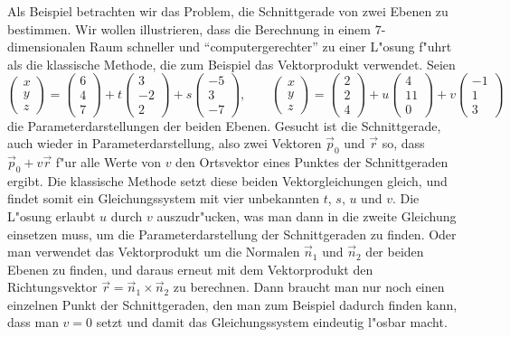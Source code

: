 Als Beispiel betrachten wir das Problem, die Schnittgerade von
zwei Ebenen zu bestimmen.
Wir wollen illustrieren, dass die
Berechnung in einem 7-dimensionalen Raum schneller und
``computergerechter'' zu einer L"osung f"uhrt als die klassische
Methode, die zum Beispiel das Vektorprodukt verwendet.
Seien 
\begin{equation}
\begin{pmatrix}x\\y\\z\end{pmatrix}
=
\begin{pmatrix}6\\4\\7\end{pmatrix}
+t
\begin{pmatrix}3\\-2\\2\end{pmatrix}
+s
\begin{pmatrix}-5\\3\\-7\end{pmatrix}
,\qquad
\begin{pmatrix}x\\y\\z\end{pmatrix}
=
\begin{pmatrix}2\\2\\4\end{pmatrix}
+u
\begin{pmatrix}4\\11\\0\end{pmatrix}
+v
\begin{pmatrix}-1\\1\\3\end{pmatrix}
\label{zweiebenen}
\end{equation}
die Parameterdarstellungen der beiden Ebenen.
Gesucht ist die
Schnittgerade, auch wieder in Parameterdarstellung, also
zwei Vektoren $\vec p_0$ und $\vec r$ so, dass $\vec p_0+v\vec r$
f"ur alle Werte von $v$ den Ortsvektor eines Punktes der
Schnittgeraden ergibt.
Die klassische Methode setzt diese beiden Vektorgleichungen
gleich, und findet somit ein Gleichungssystem mit vier unbekannten
$t$, $s$, $u$ und $v$.
Die L"osung erlaubt $u$ durch $v$ auszudr"ucken,
was man dann in die zweite Gleichung einsetzen muss, um die Parameterdarstellung
der Schnittgeraden zu finden.
Oder man verwendet das Vektorprodukt
um die Normalen $\vec n_1$ und $\vec n_2$ der beiden Ebenen zu finden, und daraus
erneut mit dem Vektorprodukt den Richtungsvektor
$\vec r=\vec n_1\times\vec n_2$ zu berechnen.
Dann braucht man nur noch einen
einzelnen Punkt der Schnittgeraden, den man zum Beispiel dadurch finden kann,
dass man $v=0$ setzt und damit das Gleichungssystem eindeutig l"osbar
macht.

